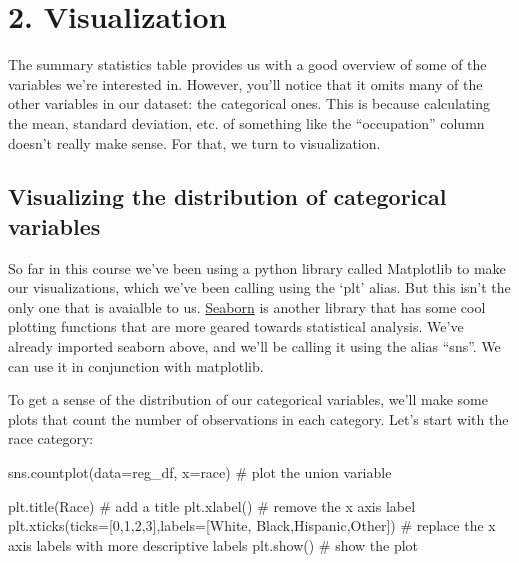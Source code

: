 \documentclass[
  letterpaper,
  DIV=11,
  numbers=noendperiod]{scrreprt}
\newenvironment{Shaded}{\begin{snugshade}}{\end{snugshade}}
\newcommand{\CommentTok}[1]{\textcolor[rgb]{0.37,0.37,0.37}{#1}}
\newcommand{\DecValTok}[1]{\textcolor[rgb]{0.68,0.00,0.00}{#1}}
\newcommand{\NormalTok}[1]{\textcolor[rgb]{0.00,0.23,0.31}{#1}}
\newcommand{\OperatorTok}[1]{\textcolor[rgb]{0.37,0.37,0.37}{#1}}
\newcommand{\StringTok}[1]{\textcolor[rgb]{0.13,0.47,0.30}{#1}}
\begin{document}
\hypertarget{visualization}{%
\section{2. Visualization}\label{visualization}}

The summary statistics table provides us with a good overview of some of
the variables we're interested in. However, you'll notice that it omits
many of the other variables in our dataset: the categorical ones. This
is because calculating the mean, standard deviation, etc. of something
like the ``occupation'' column doesn't really make sense. For that, we
turn to visualization.

\hypertarget{visualizing-the-distribution-of-categorical-variables}{%
\subsection{Visualizing the distribution of categorical
variables}\label{visualizing-the-distribution-of-categorical-variables}}

So far in this course we've been using a python library called
Matplotlib to make our visualizations, which we've been calling using
the `plt' alias. But this isn't the only one that is avaialble to us.
\href{https://seaborn.pydata.org/}{Seaborn} is another library that has
some cool plotting functions that are more geared towards statistical
analysis. We've already imported seaborn above, and we'll be calling it
using the alias ``sns''. We can use it in conjunction with matplotlib.

To get a sense of the distribution of our categorical variables, we'll
make some plots that count the number of observations in each category.
Let's start with the race category:

\begin{Shaded}
\begin{Highlighting}[]
\NormalTok{sns.countplot(data}\OperatorTok{=}\NormalTok{reg\_df, x}\OperatorTok{=}\StringTok{\textquotesingle{}race\textquotesingle{}}\NormalTok{) }\CommentTok{\# plot the union variable}

\NormalTok{plt.title(}\StringTok{\textquotesingle{}Race\textquotesingle{}}\NormalTok{) }\CommentTok{\# add a title}
\NormalTok{plt.xlabel(}\StringTok{\textquotesingle{}\textquotesingle{}}\NormalTok{) }\CommentTok{\# remove the x axis label}
\NormalTok{plt.xticks(ticks}\OperatorTok{=}\NormalTok{[}\DecValTok{0}\NormalTok{,}\DecValTok{1}\NormalTok{,}\DecValTok{2}\NormalTok{,}\DecValTok{3}\NormalTok{],labels}\OperatorTok{=}\NormalTok{[}\StringTok{\textquotesingle{}White\textquotesingle{}}\NormalTok{, }\StringTok{\textquotesingle{}Black\textquotesingle{}}\NormalTok{,}\StringTok{\textquotesingle{}Hispanic\textquotesingle{}}\NormalTok{,}\StringTok{\textquotesingle{}Other\textquotesingle{}}\NormalTok{]) }\CommentTok{\# replace the x axis labels with more descriptive labels}
\NormalTok{plt.show() }\CommentTok{\# show the plot}
\end{Highlighting}
\end{Shaded}
\end{document}
